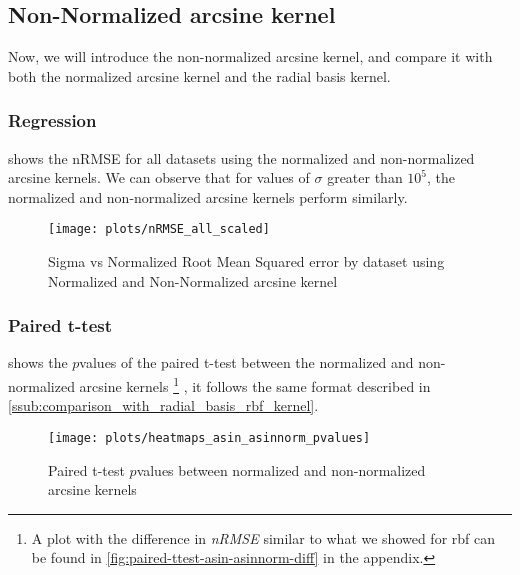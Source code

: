 
\subsection{Non-Normalized arcsine kernel}

Now, we will introduce the non-normalized arcsine kernel, and compare it with
both the normalized arcsine kernel and the radial basis kernel.

\subsubsection{Regression}

 shows the nRMSE for all datasets using the normalized
and non-normalized arcsine kernels. We can observe that for values of $\sigma$
greater than $10^5$, the normalized and non-normalized arcsine kernels perform
similarly.

\begin{figure}[H]
    \texttt{[image: plots/nRMSE\_all\_scaled]}
    \caption{Sigma vs Normalized Root Mean Squared error by dataset using Normalized and Non-Normalized arcsine kernel}%
    \label{fig:nrmse-all-scaled}
\end{figure}


\subsubsection{Paired t-test}

 shows the $p$\textendash{}values of the paired t-test
between the normalized and non-normalized arcsine kernels%
\footnote{A plot with the difference in \emph{nRMSE} similar to
    what we showed for rbf can be found in \cref{fig:paired-ttest-asin-asinnorm-diff} in the appendix.}%
, it follows the same
format described in \cref{ssub:comparison_with_radial_basis_rbf_kernel}.

\begin{figure}[H]
    \texttt{[image: plots/heatmaps\_asin\_asinnorm\_pvalues]}
    \caption{Paired t-test $p$\textendash{}values between normalized and non-normalized arcsine kernels}%
    \label{fig:paired-ttest-asin-asinnorm}
\end{figure}

